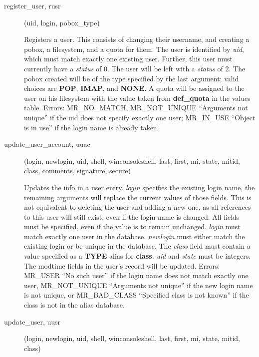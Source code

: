 \documentclass{article}
\begin{document}
\begin{description}
\item[register\_user, rusr](uid, login, pobox_type)

Registers a user. This consists of changing their username, and creating
a pobox, a filesystem, and a quota for them.  The user is identified by
{\em uid}, which must match exactly one existing user. Further, this
user must currently have a {\em status} of 0. The user will be left with
a {\em status} of 2. The pobox created will be of the type specified by
the last argument; valid choices are {\bf POP}, {\bf IMAP}, and {\bf
NONE}. A quota will be assigned to the user on his filesystem with the
value taken from {\bf def\_quota} in the values table. Errors:
MR\_NO\_MATCH, MR\_NOT\_UNIQUE ``Arguments not unique'' if the uid does
not specify exactly one user; MR\_IN\_USE ``Object is in use'' if the
login name is already taken.

\item[update\_user\_account, uuac](login, newlogin, uid, shell,
winconsoleshell, last,
first, mi, state, mitid, class, comments, signature, secure)

Updates the info in a user entry.  {\em login} specifies the existing
login name, the remaining arguments will replace the current values
of those fields.  This is not equivalent to deleting the user and
adding a new one, as all references to this user will still exist,
even if the login name is changed.  All fields must be specified, even
if the value is to remain unchanged.  {\em login} must match exactly one
user in the database.  {\em newlogin} must either match the existing
login or be unique in the database.  The {\em class} field must contain
a value specified as a {\bf TYPE} alias for {\bf class}.  {\em uid} and
{\em state} must be integers.  The modtime fields in the user's record
will be updated.  Errors: MR\_USER ``No such user'' if the login name
does not match exactly one user, MR\_NOT\_UNIQUE ``Arguments not unique''
if the new login name is not unique, or MR\_BAD\_CLASS ``Specified class
is not known'' if the class is not in the alias database.

\item[update\_user, uusr](login, newlogin, uid, shell, winconsoleshell, last, first, mi, state,
mitid, class)


\end{description}
\end{document}

